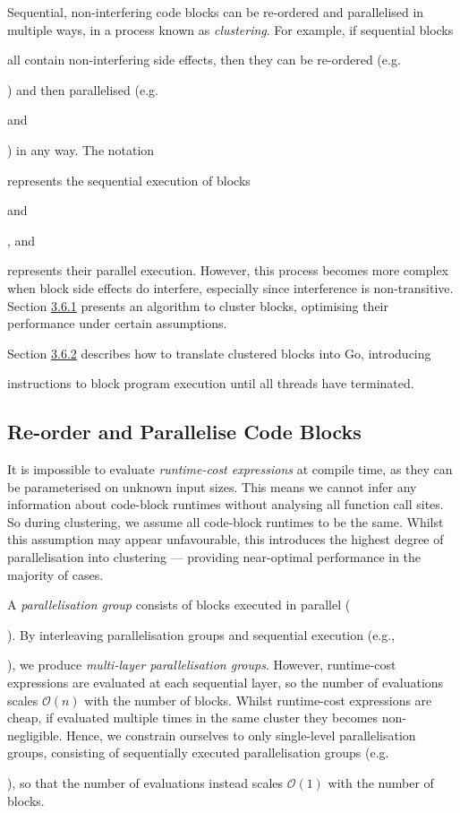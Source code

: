 \vspace{-1mm}

\label{sec:3.6}

Sequential, non-interfering code blocks can be re-ordered and parallelised in multiple ways, in a process known as \textit{clustering}. For example, if sequential blocks  all contain non-interfering side effects, then they can be re-ordered (e.g. ) and then parallelised (e.g.  and ) in any way. The notation  represents the sequential execution of blocks  and , and  represents their parallel execution. However, this process becomes more complex when block side effects do interfere, especially since interference is non-transitive. Section \hyperref[sec:3.6.1]{3.6.1} presents an algorithm to cluster blocks, optimising their performance under certain assumptions.

Section \hyperref[sec:3.6.2]{3.6.2} describes how to translate clustered blocks into Go, introducing  instructions to block program execution until all threads have terminated.

\vspace{-1mm}

\subsection{Re-order and Parallelise Code Blocks}

\vspace{-1mm}

\label{sec:3.6.1}

It is impossible to evaluate \textit{runtime-cost expressions} at compile time, as they can be parameterised on unknown input sizes. This means we cannot infer any information about code-block runtimes without analysing all function call sites. So during clustering, we assume all code-block runtimes to be the same. Whilst this assumption may appear unfavourable, this introduces the highest degree of parallelisation into clustering --- providing near-optimal performance in the majority of cases.

A \textit{parallelisation group} consists of blocks executed in parallel (). By interleaving parallelisation groups and sequential execution (e.g., ), we produce \textit{multi-layer parallelisation groups}. However, runtime-cost expressions are evaluated at each sequential layer, so the number of evaluations scales \( \mathcal{O}(n) \) with the number of blocks. Whilst runtime-cost expressions are cheap, if evaluated multiple times in the same cluster they becomes non-negligible. Hence, we constrain ourselves to only single-level parallelisation groups, consisting of sequentially executed parallelisation groups (e.g. ), so that the number of evaluations instead scales \( \mathcal{O}(1) \) with the number of blocks.

